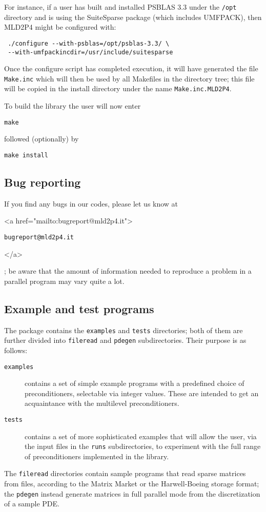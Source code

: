 For instance, if a user has built and installed PSBLAS 3.3 under the
\verb|/opt| directory and is
using the SuiteSparse package (which includes UMFPACK), then MLD2P4
might be configured with:
\begin{verbatim}
 ./configure --with-psblas=/opt/psblas-3.3/ \
 --with-umfpackincdir=/usr/include/suitesparse
\end{verbatim}
Once the configure script has completed execution, it will have
generated the file \verb|Make.inc| which will then be used by all
Makefiles in the directory tree; this file will be copied in the
install directory under the name \verb|Make.inc.MLD2P4|.

To build the library the user will now enter 
\begin{verbatim}
make
\end{verbatim}
followed (optionally) by 
\begin{verbatim}
make install
\end{verbatim}
\subsection{Bug reporting}
If you find any bugs in our codes, please let us know at
\begin{rawhtml}
<a href="mailto:bugreport@mld2p4.it">
\end{rawhtml}
\texttt{bugreport@mld2p4.it}
\begin{rawhtml}
</a>
\end{rawhtml}
; be aware that  
the amount of information needed to reproduce a problem in a parallel
program may vary quite a lot. 
\subsection{Example and test programs\label{sec:ex_and_test}}
The package contains the \verb|examples| and \verb|tests| directories;
both of them are further divided into \verb|fileread| and
\verb|pdegen| subdirectories. Their purpose is as follows:
\begin{description}
\item[\tt examples] contains a set of simple example programs with a
  predefined choice of preconditioners, selectable via integer
  values. These are intended to get an acquaintance with the
  multilevel preconditioners.
\item[\tt tests] contains a set of more sophisticated examples that
  will allow the user, via the input files in the \verb|runs|
  subdirectories, to experiment with the full range of preconditioners
  implemented in the library.
\end{description}
The \verb|fileread| directories contain sample programs that read
sparse matrices from files, according to the Matrix Market or the
Harwell-Boeing storage format; the \verb|pdegen| instead generate
matrices in full parallel mode from the discretization of a sample PDE. 
